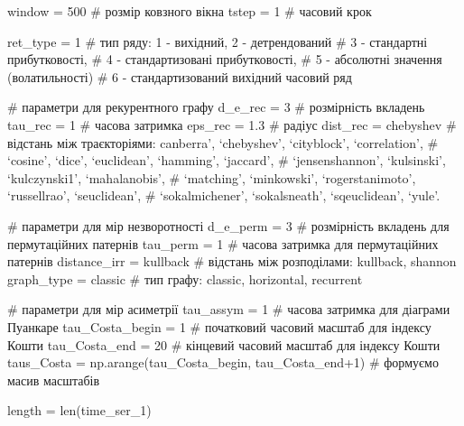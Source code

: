 \documentclass[
  letterpaper,
]{report}
\newenvironment{Shaded}{\begin{snugshade}}{\end{snugshade}}
\newcommand{\BuiltInTok}[1]{\textcolor[rgb]{0.00,0.23,0.31}{#1}}
\newcommand{\CommentTok}[1]{\textcolor[rgb]{0.37,0.37,0.37}{#1}}
\newcommand{\DecValTok}[1]{\textcolor[rgb]{0.68,0.00,0.00}{#1}}
\newcommand{\FloatTok}[1]{\textcolor[rgb]{0.68,0.00,0.00}{#1}}
\newcommand{\NormalTok}[1]{\textcolor[rgb]{0.00,0.23,0.31}{#1}}
\newcommand{\OperatorTok}[1]{\textcolor[rgb]{0.37,0.37,0.37}{#1}}
\newcommand{\StringTok}[1]{\textcolor[rgb]{0.13,0.47,0.30}{#1}}
\begin{document}
\begin{Shaded}
\begin{Highlighting}[]
\NormalTok{window }\OperatorTok{=} \DecValTok{500} \CommentTok{\# розмір ковзного вікна}
\NormalTok{tstep }\OperatorTok{=} \DecValTok{1} \CommentTok{\# часовий крок}

\NormalTok{ret\_type }\OperatorTok{=} \DecValTok{1} \CommentTok{\# тип ряду: 1 {-} вихідний, 2 {-} детрендований}
                        \CommentTok{\# 3 {-} стандартні прибутковості, }
                        \CommentTok{\# 4 {-} стандартизовані прибутковості, }
                        \CommentTok{\# 5 {-} абсолютні значення (волатильності)}
                        \CommentTok{\# 6 {-} стандартизований вихідний часовий ряд}


\CommentTok{\# параметри для рекурентного графу}
\NormalTok{d\_e\_rec }\OperatorTok{=} \DecValTok{3} \CommentTok{\# розмірність вкладень}
\NormalTok{tau\_rec }\OperatorTok{=} \DecValTok{1} \CommentTok{\# часова затримка}
\NormalTok{eps\_rec }\OperatorTok{=} \FloatTok{1.3} \CommentTok{\# радіус}
\NormalTok{dist\_rec }\OperatorTok{=} \StringTok{\textquotesingle{}chebyshev\textquotesingle{}} \CommentTok{\# відстань між траєкторіями: canberra’, ‘chebyshev’, ‘cityblock’, ‘correlation’, }
                                                        \CommentTok{\# ‘cosine’, ‘dice’, ‘euclidean’, ‘hamming’, ‘jaccard’, }
                                                        \CommentTok{\# ‘jensenshannon’, ‘kulsinski’, ‘kulczynski1’, ‘mahalanobis’, }
                                                        \CommentTok{\# ‘matching’, ‘minkowski’, ‘rogerstanimoto’, ‘russellrao’, ‘seuclidean’, }
                                                        \CommentTok{\# ‘sokalmichener’, ‘sokalsneath’, ‘sqeuclidean’, ‘yule’.}


\CommentTok{\# параметри для мір незворотності}
\NormalTok{d\_e\_perm }\OperatorTok{=} \DecValTok{3} \CommentTok{\# розмірність вкладень для пермутаційних патернів }
\NormalTok{tau\_perm  }\OperatorTok{=} \DecValTok{1} \CommentTok{\# часова затримка для пермутаційних патернів}
\NormalTok{distance\_irr }\OperatorTok{=} \StringTok{\textquotesingle{}kullback\textquotesingle{}} \CommentTok{\# відстань між розподілами: kullback, shannon}
\NormalTok{graph\_type }\OperatorTok{=} \StringTok{\textquotesingle{}classic\textquotesingle{}} \CommentTok{\# тип графу: classic, horizontal, recurrent}

\CommentTok{\# параметри для мір асиметрії}
\NormalTok{tau\_assym }\OperatorTok{=} \DecValTok{1} \CommentTok{\# часова затримка для діаграми Пуанкаре}
\NormalTok{tau\_Costa\_begin }\OperatorTok{=} \DecValTok{1} \CommentTok{\# початковий часовий масштаб для індексу Кошти}
\NormalTok{tau\_Costa\_end }\OperatorTok{=} \DecValTok{20} \CommentTok{\# кінцевий часовий масштаб для індексу Кошти}
\NormalTok{taus\_Costa }\OperatorTok{=}\NormalTok{ np.arange(tau\_Costa\_begin, tau\_Costa\_end}\OperatorTok{+}\DecValTok{1}\NormalTok{) }\CommentTok{\# формуємо масив масштабів}
                
\NormalTok{length }\OperatorTok{=} \BuiltInTok{len}\NormalTok{(time\_ser\_1)}
\end{Highlighting}
\end{Shaded}
\end{document}
